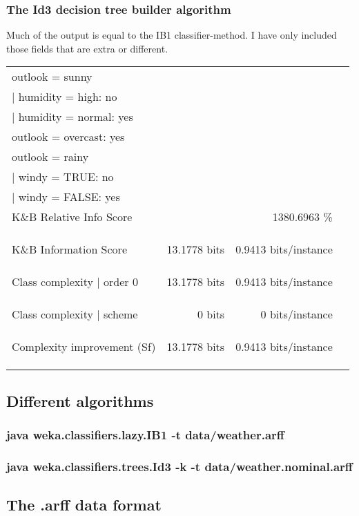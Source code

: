 \documentclass[english,a4paper]{article}
\begin{document}
\subsubsection{The Id3 decision tree builder algorithm}
Much of the output is equal to the IB1 classifier-method. I have only included
those fields that are extra or different.
\begin{longtable}{|lrr|l|}
\hline
outlook = sunny&&&\\
|  humidity = high: no&&&\\
|  humidity = normal: yes&&&\\
outlook = overcast: yes&&&\\
outlook = rainy&&&\\
|  windy = TRUE: no&&&\\
|  windy = FALSE: yes&&&\\
\hline
K\&B Relative Info Score&&               1380.6963 \%&\multirow{3}{210pt}{

}\\
&&&\\
&&&\\
&&&\\
K\&B Information Score &                  13.1778 bits&      0.9413
bits/instance&\multirow{3}{210pt}{

}\\
&&&\\
&&&\\
&&&\\
Class complexity | order 0   &           13.1778 bits  &    0.9413
bits/instance&\multirow{3}{210pt}{

}\\
&&&\\
&&&\\
&&&\\
Class complexity | scheme             &   0      bits   &   0     
bits/instance&\multirow{3}{210pt}{

}\\
&&&\\
&&&\\
&&&\\
Complexity improvement     (Sf)     &    13.1778 bits  &    0.9413
bits/instance&\multirow{3}{210pt}{

}\\
&&&\\
&&&\\
&&&\\

\hline
\end{longtable}

\subsection{Different algorithms}
\subsubsection{java weka.classifiers.lazy.IB1 -t data/weather.arff}
\subsubsection{java weka.classifiers.trees.Id3 -k -t data/weather.nominal.arff}
\subsection{The .arff data format}
\end{document}
